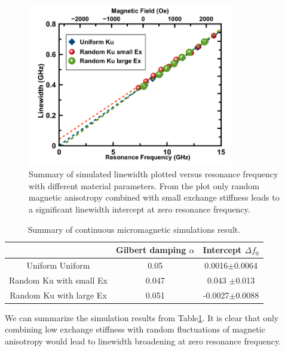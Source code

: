 \begin{figure}[h!]
  \centering
  \includegraphics[width=0.8\textwidth]{fig/CW_sim/LW_summary.png}
  \caption{Summary of simulated linewidth plotted versus resonance frequency with different material parameters. From the plot only random magnetic anisotropy combined with small exchange stiffness leads to a significant linewidth intercept at zero resonance frequency.}
  \label{fig:CW_lw_summary}
\end{figure}


\begin{table}[h!]
\centering
 \begin{tabular}{||c c c||} 
 \hline
  & Gilbert damping $\alpha$  & Intercept $\Delta f_0$\\ [2.0ex] 
 \hline\hline
 Uniform
Uniform  & 0.05 & 0.0016$\pm$0.0064  \\ 
 \hline
 Random Ku with small Ex  & 0.047 & 0.043 $\pm$0.013 \\
 \hline
 Random Ku with large Ex  & 0.051 & -0.0027$\pm$0.0088  \\
 \hline
\end{tabular}
\caption{Summary of continuous micromagnetic simulations result. }
\label{table:summary_LW}
\end{table}

We can summarize the simulation results from Table\ref{table:summary_LW}. It is clear that only combining low exchange stiffness with random fluctuations of magnetic anisotropy would lead to linewidth broadening at zero resonance frequency.

\newpage
